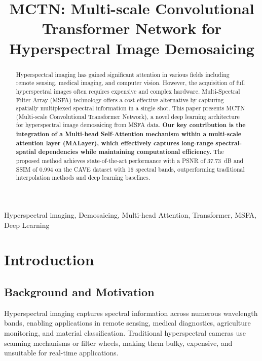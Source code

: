 \documentclass[conference]{IEEEtran}
\begin{document}
\title{MCTN: Multi-scale Convolutional Transformer Network for Hyperspectral Image Demosaicing}

\author{
}

\maketitle

\begin{abstract}
Hyperspectral imaging has gained significant attention in various fields including remote sensing, medical imaging, and computer vision. However, the acquisition of full hyperspectral images often requires expensive and complex hardware. Multi-Spectral Filter Array (MSFA) technology offers a cost-effective alternative by capturing spatially multiplexed spectral information in a single shot. This paper presents MCTN (Multi-scale Convolutional Transformer Network), a novel deep learning architecture for hyperspectral image demosaicing from MSFA data. \textbf{Our key contribution is the integration of a Multi-head Self-Attention mechanism within a multi-scale attention layer (MALayer), which effectively captures long-range spectral-spatial dependencies while maintaining computational efficiency.} The proposed method achieves state-of-the-art performance with a PSNR of 37.73~dB and SSIM of 0.994 on the CAVE dataset with 16 spectral bands, outperforming traditional interpolation methods and deep learning baselines.
\end{abstract}

\begin{IEEEkeywords}
Hyperspectral imaging, Demosaicing, Multi-head Attention, Transformer, MSFA, Deep Learning
\end{IEEEkeywords}

\section{Introduction}

\subsection{Background and Motivation}

Hyperspectral imaging captures spectral information across numerous wavelength bands, enabling applications in remote sensing, medical diagnostics, agriculture monitoring, and material classification. Traditional hyperspectral cameras use scanning mechanisms or filter wheels, making them bulky, expensive, and unsuitable for real-time applications.
\end{document}
